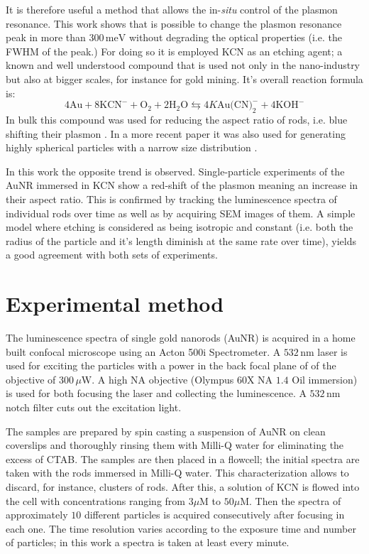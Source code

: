\documentclass[twocolumn]{article}
\begin{document}
It is therefore useful a method that allows the in-\textit{situ} control of the
plasmon resonance. This work shows that is possible to change the plasmon
resonance peak in more than $300\,\textrm{meV}$ without degrading the optical
properties (i.e. the FWHM of the peak.) For doing so it is employed KCN as an
etching agent; a known and well understood compound that is used not only in the
nano-industry but also at bigger scales, for instance for gold mining. It's
overall reaction formula is:
\begin{equation*}
4\textrm{Au} + 8\textrm{KCN}^-+\textrm{O}_2 + 2\textrm{H}_2\textrm{O}
\leftrightarrows 4K\textrm{Au(CN)}_2^-+4\textrm{KOH}^-
\end{equation*}
In bulk this compound was used for reducing the aspect ratio of rods, i.e.
blue shifting their plasmon \cite{Jana2002}. In a more recent paper it was also
used for generating highly spherical particles with a narrow size
distribution \cite{Lee2013}.

In this work the opposite trend is observed. Single-particle experiments of the
AuNR immersed in KCN show a red-shift of the plasmon meaning an increase in
their aspect ratio. This is confirmed by tracking the luminescence spectra of
individual rods over time as well as by acquiring SEM images of them. A simple
model where etching is considered as being isotropic and constant (i.e. both the
radius of the particle and it's length diminish at the same rate over time),
yields a good agreement with both sets of experiments.

\section{Experimental method}
The luminescence spectra of single gold nanorods (AuNR) is acquired in a home
built confocal microscope using an Acton 500i Spectrometer. A $532\,\textrm{nm}$
laser is used for exciting the particles with a power in the back focal plane of
of the objective of $300\,\mu\textrm{W}$. A high NA objective (Olympus $60$X NA
$1.4$ Oil immersion) is used for both focusing the laser and collecting the
luminescence. A $532\,\textrm{nm}$ notch filter cuts out the excitation light.

The samples are prepared by spin casting a suspension of AuNR on clean
coverslips and thoroughly rinsing them  with Milli-Q water for eliminating the
excess of CTAB. The samples are then placed in a flowcell; the initial spectra
are taken with the rods immersed in Milli-Q water. This characterization allows
to discard, for instance, clusters of rods. After this, a solution of KCN is
flowed into the cell with concentrations ranging from $3\mu\textrm{M}$ to
$50\mu\textrm{M}$. Then the spectra of approximately $10$ different particles is
acquired consecutively after focusing in each one. The time resolution varies
according to the exposure time and number of particles; in this work a spectra
is taken at least every minute.
\end{document}
